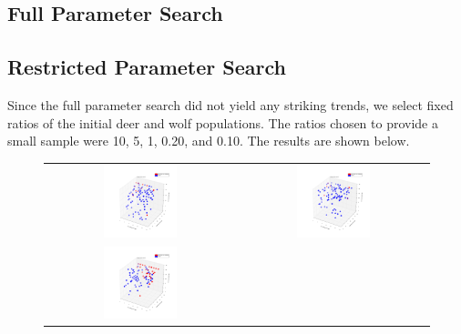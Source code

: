 \documentclass[a4paper,12pt]{article}
\begin{document}
\subsection{Full Parameter Search}

\subsection{Restricted Parameter Search}
\indent
\indent Since the full parameter search did not yield any striking trends, we select fixed ratios of the initial deer and wolf populations.  The ratios chosen to provide 
a small sample were 10, 5, 1, 0.20, and 0.10. The results are shown below.

  \begin{figure}[H]
  \centering
        \begin{tabular}{@{}cc@{}}
                \includegraphics[width = 0.4\textwidth]{./pics/Restricted_Parameter_space_d2500_w250.png} &
                \includegraphics[width = 0.4\textwidth]{./pics/Restricted_Parameter_space_d3000_w500.png} \\
                \includegraphics[width = 0.4\textwidth]{./pics/Restricted_Parameter_space_d2000_w2000.png} &

\end{tabular}
\end{figure}
\end{document}
